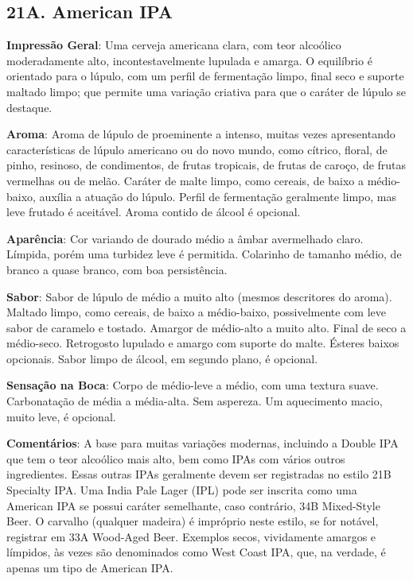 \subsection*{21A. American IPA}
\textbf{Impressão Geral}: Uma cerveja americana clara, com teor alcoólico moderadamente alto, incontestavelmente lupulada e amarga. O equilíbrio é orientado para o lúpulo, com um perfil de fermentação limpo, final seco e suporte maltado limpo; que permite uma variação criativa para que o caráter de lúpulo se destaque.

\textbf{Aroma}: Aroma de lúpulo de proeminente a intenso, muitas vezes apresentando características de lúpulo americano ou do novo mundo, como cítrico, floral, de pinho, resinoso, de condimentos, de frutas tropicais, de frutas de caroço, de frutas vermelhas ou de melão. Caráter de malte limpo, como cereais, de baixo a médio-baixo, auxília a atuação do lúpulo. Perfil de fermentação geralmente limpo, mas leve frutado é aceitável. Aroma contido de álcool é opcional.

\textbf{Aparência}: Cor variando de dourado médio a âmbar avermelhado claro. Límpida, porém uma turbidez leve é permitida. Colarinho de tamanho médio, de branco a quase branco, com boa persistência.

\textbf{Sabor}: Sabor de lúpulo de médio a muito alto (mesmos descritores do aroma). Maltado limpo, como cereais, de baixo a médio-baixo, possivelmente com leve sabor de caramelo e tostado. Amargor de médio-alto a muito alto. Final de seco a médio-seco. Retrogosto lupulado e amargo com suporte do malte. Ésteres baixos opcionais. Sabor limpo de álcool, em segundo plano, é opcional.

\textbf{Sensação na Boca}: Corpo de médio-leve a médio, com uma textura suave. Carbonatação de média a média-alta. Sem aspereza. Um aquecimento macio, muito leve, é opcional.

\textbf{Comentários}: A base para muitas variações modernas, incluindo a Double IPA que tem o teor alcoólico mais alto, bem como IPAs com vários outros ingredientes. Essas outras IPAs geralmente devem ser registradas no estilo 21B Specialty IPA. Uma India Pale Lager (IPL) pode ser inscrita como uma American IPA se possui caráter semelhante, caso contrário, 34B Mixed-Style Beer. O carvalho (qualquer madeira) é impróprio neste estilo, se for notável, registrar em 33A Wood-Aged Beer. Exemplos secos, vividamente amargos e límpidos, às vezes são denominados como West Coast IPA, que, na verdade, é apenas um tipo de American IPA.

